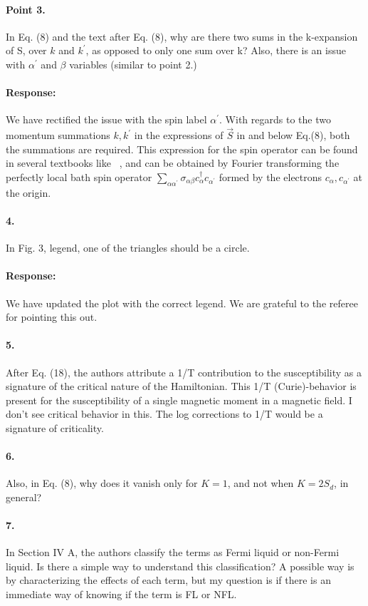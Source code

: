 \documentclass[11pt]{article}
\begin{document}
\paragraph{Point 3.} 
In Eq. (8) and the text after Eq. (8), why are there two sums in the
k-expansion of S, over $k$ and $k^\prime$, as opposed to only one sum over k? Also, there
is an issue with $\alpha^\prime$ and $\beta$ variables (similar to point 2.)

{\color{blue}\paragraph{Response:} We have rectified the issue with the spin label \(\alpha^\prime\). With regards to the two momentum summations \(k,k^\prime\) in the expressions of \(\vec S\) in and below Eq.(8), both the summations are required. This expression for the spin operator can be found in several textbooks like ~\cite{coleman2015,hewson1993}, and can be obtained by Fourier transforming the perfectly local bath spin operator \(\sum_{\alpha\alpha^\prime}\sigma_{\alpha\beta}c^\dagger_{\alpha}c_{\alpha^\prime}\) formed by the electrons \(c_{\alpha},c_{\alpha^\prime}\) at the origin.}

\paragraph{4.}
In Fig. 3, legend, one of the triangles should be a circle.

{\color{blue}\paragraph{Response:} We have updated the plot with the correct legend. We are grateful to the referee for pointing this out.}

\paragraph{5.}
After Eq. (18), the authors attribute a 1/T contribution to the
susceptibility as a signature of the critical nature of the Hamiltonian. This 1/T (Curie)-behavior is present for the susceptibility of a single magnetic moment in a magnetic field. I don't see critical behavior in this. The log corrections to 1/T would be a signature of criticality.

\paragraph{6.}
Also, in Eq. (8), why does it vanish only for $K=1$, and not when $K=2S_{d}$, in general?

\paragraph{7.}
In Section IV A, the authors classify the terms as Fermi liquid or non-Fermi liquid. Is there a simple way to understand this classification? A possible way is by characterizing the effects of each term, but my question is if there is an immediate way of knowing if the term is FL or NFL.



\end{document}
